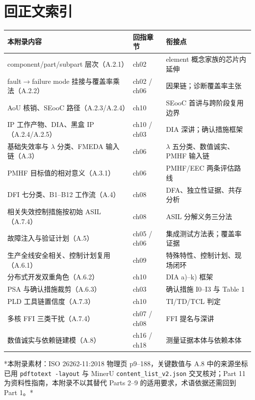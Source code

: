 \section{回正文索引}

\begingroup\small
\setlength{\tabcolsep}{4pt}
\begin{xltabular}{\linewidth}{@{}XXX@{}}
\toprule
本附录内容 & 回指章节 & 衔接点 \\
\midrule
\endhead
component/part/subpart 层次（A.2.1） & ch02 & element 概念家族的芯片内延伸 \\
fault\(\rightarrow\)failure mode 挂接与覆盖率乘法（A.2.2） & ch02 / ch06 & 因果链；诊断覆盖率主张 \\
AoU 核销、SEooC 路径（A.2.3/A.2.4） & ch10 & SEooC 首讲与跨阶段复用边界 \\
IP 工作产物、DIA、黑盒 IP（A.2.4/A.2.5） & ch10 / ch03 & DIA 深讲；确认措施框架 \\
基础失效率与 \(\lambda\) 分类、FMEDA 输入链（A.3） & ch06 & \(\lambda\) 五分类、数值诚实、PMHF 输入链 \\
PMHF 目标值的相对意义（A.3.1） & ch06 & PMHF/EEC 两条评估路线 \\
DFI 七分类、B1–B12 工作流（A.4） & ch08 & DFA、独立性证据、共存分析 \\
相关失效控制措施按初始 ASIL（A.7.4） & ch08 & ASIL 分解义务三分法 \\
故障注入与验证计划（A.5） & ch05 / ch06 & 集成测试方法表；覆盖率证据 \\
生产全线安全相关、控制计划复用（A.6.1） & ch09 & 特殊特性、控制计划、现场闭环 \\
分布式开发双重角色（A.6.2） & ch10 & DIA a)–k) 框架 \\
PSA 与确认措施裁剪（A.6.3） & ch03 & 确认措施 I0–I3 与 Table 1 \\
PLD 工具链置信度（A.7.3） & ch10 & TI/TD/TCL 判定 \\
多核 FFI 三类干扰（A.7.4） & ch07 / ch08 & FFI 提名与深讲 \\
数值诚实与依赖链建模（A.8） & ch16 / ch18 & 测量证据本体与依赖本体 \\
\bottomrule
\end{xltabular}
\endgroup


*本附录素材：ISO 26262-11:2018 物理页 p9–188，关键数值与 A.8 中的来源坐标已用 \allowbreak{}\texttt{pdftotext \allowbreak{}-\allowbreak{}layout}\allowbreak{} 与 MinerU \nolinkurl{content_list_v2.json} 交叉核对；Part 11 为资料性指南，本附录不以其替代 Parts 2–9 的适用要求，术语依据还需回到 Part 1。*
